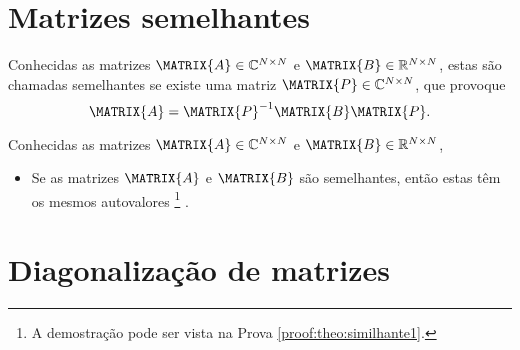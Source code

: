 \section{Matrizes semelhantes}


\begin{definition}\label{def:similhante0}
Conhecidas as matrizes  $\MATRIX{A} \in \mathbb{C}^{N \times N}$ e $\MATRIX{B} \in \mathbb{R}^{N \times N}$,
estas são chamadas semelhantes \cite[pp. 67]{golub2013matrix} se existe uma matriz $\MATRIX{P} \in \mathbb{C}^{N \times N}$, que provoque
\begin{equation}
\MATRIX{A} = \MATRIX{P}^{-1} \MATRIX{B} \MATRIX{P}.
\end{equation}
\end{definition}

\begin{theorem}\label{theo:similhante1}
Conhecidas as matrizes $\MATRIX{A} \in \mathbb{C}^{N \times N}$ e $\MATRIX{B} \in \mathbb{R}^{N \times N}$,
\begin{itemize}
\item Se as matrizes $\MATRIX{A}$ e $\MATRIX{B}$ são semelhantes, então estas têm os mesmos autovalores
\footnote{A demostração pode ser vista na Prova \ref{proof:theo:similhante1}.} \cite[pp. 67]{golub2013matrix}.
\end{itemize}
\end{theorem}

\section{Diagonalização de matrizes}

